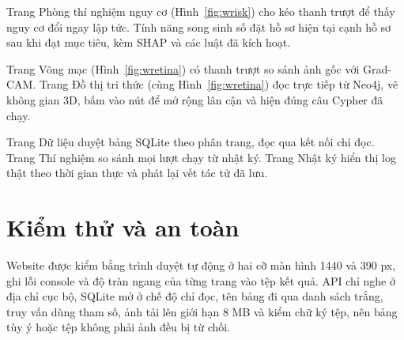 
Trang Phòng thí nghiệm nguy cơ (Hình~\ref{fig:wrisk}) cho kéo thanh trượt để thấy nguy cơ đổi ngay lập tức. Tính năng song sinh số đặt hồ sơ hiện tại cạnh hồ sơ sau khi đạt mục tiêu, kèm SHAP và các luật đã kích hoạt.


Trang Võng mạc (Hình~\ref{fig:wretina}) có thanh trượt so sánh ảnh gốc với Grad-CAM. Trang Đồ thị tri thức (cùng Hình~\ref{fig:wretina}) đọc trực tiếp từ Neo4j, vẽ không gian 3D, bấm vào nút để mở rộng lân cận và hiện đúng câu Cypher đã chạy.


Trang Dữ liệu duyệt bảng SQLite theo phân trang, đọc qua kết nối chỉ đọc. Trang Thí nghiệm so sánh mọi lượt chạy từ nhật ký. Trang Nhật ký hiển thị log thật theo thời gian thực và phát lại vết tác tử đã lưu.


\section{Kiểm thử và an toàn}

Website được kiểm bằng trình duyệt tự động ở hai cỡ màn hình 1440 và 390 px, ghi lỗi console và độ tràn ngang của từng trang vào tệp kết quả. API chỉ nghe ở địa chỉ cục bộ, SQLite mở ở chế độ chỉ đọc, tên bảng đi qua danh sách trắng, truy vấn dùng tham số, ảnh tải lên giới hạn 8 MB và kiểm chữ ký tệp, nên bảng tùy ý hoặc tệp không phải ảnh đều bị từ chối.
